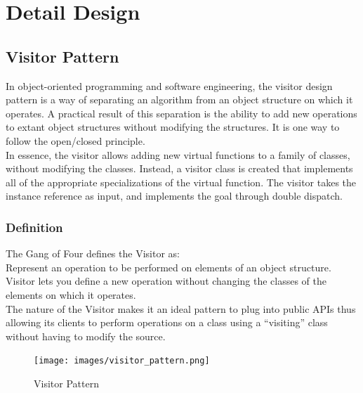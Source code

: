 \section{Detail Design}
\subsection{Visitor Pattern}
In object-oriented programming and software engineering, the visitor design pattern is a way of separating an algorithm from an object structure on which it operates. A practical result of this separation is the ability to add new operations to extant object structures without modifying the structures. It is one way to follow the open/closed principle.\\
In essence, the visitor allows adding new virtual functions to a family of classes, without modifying the classes. Instead, a visitor class is created that implements all of the appropriate specializations of the virtual function. The visitor takes the instance reference as input, and implements the goal through double dispatch.
\subsubsection{Definition}
The Gang of Four defines the Visitor as:\\
Represent an operation to be performed on elements of an object structure. Visitor lets you define a new operation without changing the classes of the elements on which it operates.\\
The nature of the Visitor makes it an ideal pattern to plug into public APIs thus allowing its clients to perform operations on a class using a “visiting” class without having to modify the source.
\begin{figure}[H]
	\centering
	\texttt{[image: images/visitor\_pattern.png]}
	\caption{Visitor Pattern}
\end{figure}
